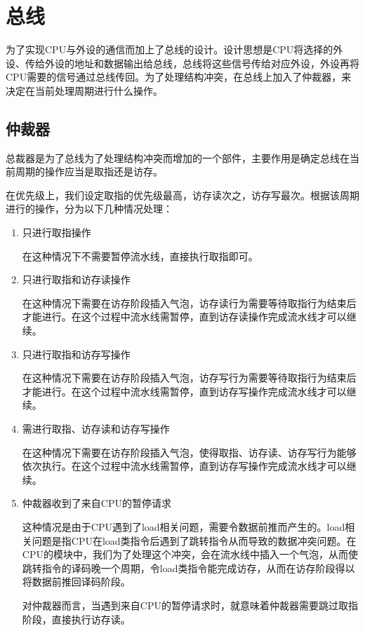 \section{总线}

为了实现CPU与外设的通信而加上了总线的设计。设计思想是CPU将选择的外设、传给外设的地址和数据输出给总线，总线将这些信号传给对应外设，外设再将CPU需要的信号通过总线传回。为了处理结构冲突，在总线上加入了仲裁器，来决定在当前处理周期进行什么操作。

\subsection{仲裁器}

总裁器是为了总线为了处理结构冲突而增加的一个部件，主要作用是确定总线在当前周期的操作应当是取指还是访存。

在优先级上，我们设定取指的优先级最高，访存读次之，访存写最次。根据该周期进行的操作，分为以下几种情况处理：

\begin{enumerate}
	\item 只进行取指操作
	
	在这种情况下不需要暂停流水线，直接执行取指即可。
	
	\item 只进行取指和访存读操作
	
	在这种情况下需要在访存阶段插入气泡，访存读行为需要等待取指行为结束后才能进行。在这个过程中流水线需暂停，直到访存读操作完成流水线才可以继续。
	
	\item 只进行取指和访存写操作
	
	在这种情况下需要在访存阶段插入气泡，访存写行为需要等待取指行为结束后才能进行。在这个过程中流水线需暂停，直到访存写操作完成流水线才可以继续。
	
	\item 需进行取指、访存读和访存写操作
	
	在这种情况下需要在访存阶段插入气泡，使得取指、访存读、访存写行为能够依次执行。在这个过程中流水线需暂停，直到访存写操作完成流水线才可以继续。
	
	\item 仲裁器收到了来自CPU的暂停请求
	
	这种情况是由于CPU遇到了load相关问题，需要令数据前推而产生的。load相关问题是指CPU在load类指令后遇到了跳转指令从而导致的数据冲突问题。在CPU的模块中，我们为了处理这个冲突，会在流水线中插入一个气泡，从而使跳转指令的译码晚一个周期，令load类指令能完成访存，从而在访存阶段得以将数据前推回译码阶段。
	
	对仲裁器而言，当遇到来自CPU的暂停请求时，就意味着仲裁器需要跳过取指阶段，直接执行访存读。
		
\end{enumerate}

